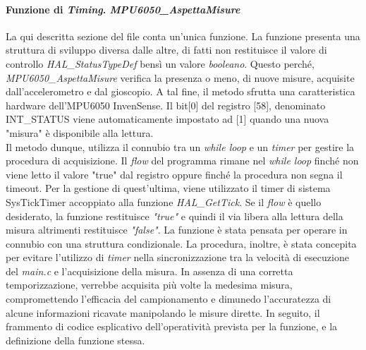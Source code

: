 \documentclass[11pt]{report}
\begin{document}
\paragraph{Funzione di \textit{Timing}. \textit{MPU6050\_AspettaMisure}}
La qui descritta sezione del file conta un'unica funzione. La funzione presenta una struttura di sviluppo diversa dalle altre, di fatti non restituisce il valore di controllo \textit{HAL\_StatusTypeDef} bensì un valore \textit{booleano}. Questo perché,
\textit{MPU6050\_AspettaMisure} verifica la presenza o meno, di nuove misure, acquisite dall'accelerometro e dal gioscopio. A tal fine, il metodo sfrutta una caratteristica hardware dell'MPU6050 InvenSense.
Il bit[0] del registro [58], denominato INT\_STATUS viene automaticamente impostato ad [1] quando una nuova "misura" è disponibile alla lettura.\\
Il metodo dunque, utilizza il connubio tra un \textit{while loop} e un \textit{timer} per gestire la procedura di acquisizione.
Il \textit{flow} del programma rimane nel \textit{while loop} finché non viene letto il valore "true" dal registro oppure finché la procedura non segna il timeout. Per la gestione di quest'ultima, viene utilizzato il timer di sistema SysTickTimer accoppiato alla funzione \textit{HAL\_GetTick}.
Se il \textit{flow} è quello desiderato, la funzione restituisce \textit{"true"} e quindi il via libera alla lettura della misura altrimenti restituisce \textit{"false"}.
La funzione è stata pensata per operare in connubio con una struttura condizionale.
La procedura, inoltre, è stata concepita per evitare l'utilizzo di \textit{timer} nella sincronizzazione tra la velocità di esecuzione del \textit{main.c} e l'acquisizione della misura. In assenza di una corretta temporizzazione, verrebbe acquisita più volte la medesima misura, compromettendo l'efficacia del campionamento e dimunedo l'accuratezza di alcune informazioni ricavate manipolando le misure dirette.
In seguito, il frammento di codice esplicativo dell'operatività prevista per la funzione, e la definizione della funzione stessa.

%
\end{document}
